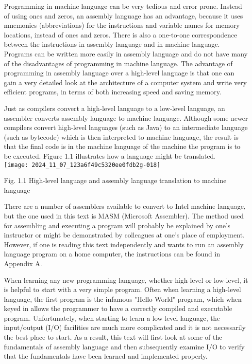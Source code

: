 \documentclass[10pt]{article}
\begin{document}
Programming in machine language can be very tedious and error prone. Instead of using ones and zeros, an assembly language has an advantage, because it uses mnemonics (abbreviations) for the instructions and variable names for memory locations, instead of ones and zeros. There is also a one-to-one correspondence between the instructions in assembly language and in machine language. Programs can be written more easily in assembly language and do not have many of the disadvantages of programming in machine language. The advantage of programming in assembly language over a high-level language is that one can gain a very detailed look at the architecture of a computer system and write very efficient programs, in terms of both increasing speed and saving memory.

Just as compilers convert a high-level language to a low-level language, an assembler converts assembly language to machine language. Although some newer compilers convert high-level languages (such as Java) to an intermediate language (such as bytecode) which is then interpreted to machine language, the result is that the final code is in the machine language of the machine the program is to be executed. Figure 1.1 illustrates how a language might be translated.\\
\texttt{[image: 2024\_11\_07\_123a6f49c5320ee0fdb2g-018]}

Fig. 1.1 High-level language and assembly language translation to machine language

There are a number of assemblers available to convert to Intel machine language, but the one used in this text is MASM (Microsoft Assembler). The method used for assembling and executing a program will probably be explained by one's instructor or might be demonstrated by colleagues at one's place of employment. However, if one is reading this text independently and wants to run an assembly language program on a home computer, the instructions can be found in Appendix A.

When learning any new programming language, whether high-level or low-level, it is helpful to start with a very simple program. Often when learning a high-level language, the first program is the infamous "Hello World" program, which when keyed in allows the programmer to have a correctly compiled and executable program. Unfortunately, when starting to learn a low-level language, the input/output (I/O) facilities are much more complicated and it is not necessarily the best place to start. As a result, this text will first look at some of the fundamentals of assembly language and then subsequently examine I/O to verify that the fundamentals have been learned and implemented properly.
\end{document}
